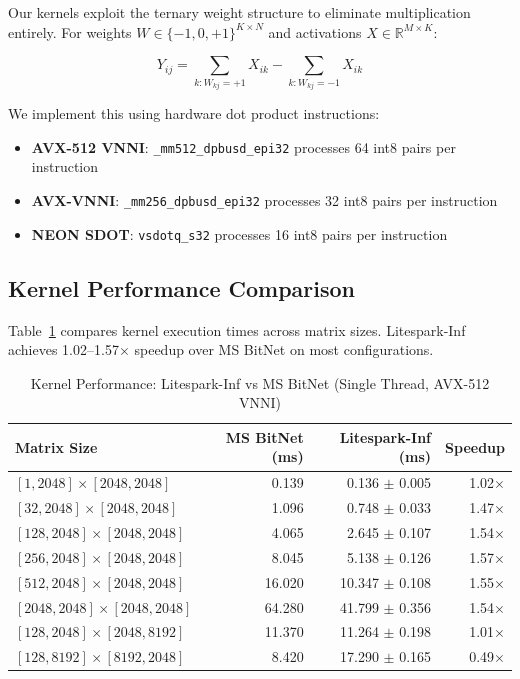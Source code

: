 \documentclass[11pt,a4paper]{article}
\begin{document}
Our kernels exploit the ternary weight structure to eliminate multiplication entirely. For weights $W \in \{-1, 0, +1\}^{K \times N}$ and activations $X \in \mathbb{R}^{M \times K}$:

\begin{equation}
Y_{ij} = \sum_{k: W_{kj}=+1} X_{ik} - \sum_{k: W_{kj}=-1} X_{ik}
\end{equation}

We implement this using hardware dot product instructions:
\begin{itemize}
    \item \textbf{AVX-512 VNNI}: \texttt{\_mm512\_dpbusd\_epi32} processes 64 int8 pairs per instruction
    \item \textbf{AVX-VNNI}: \texttt{\_mm256\_dpbusd\_epi32} processes 32 int8 pairs per instruction
    \item \textbf{NEON SDOT}: \texttt{vsdotq\_s32} processes 16 int8 pairs per instruction
\end{itemize}

\subsection{Kernel Performance Comparison}

Table~\ref{tab:kernel_perf} compares kernel execution times across matrix sizes. Litespark-Inf achieves 1.02--1.57$\times$ speedup over MS BitNet on most configurations.

\begin{table}[H]
\centering
\caption{Kernel Performance: Litespark-Inf vs MS BitNet (Single Thread, AVX-512 VNNI)}
\label{tab:kernel_perf}
\begin{tabular}{lrrr}
\toprule
\textbf{Matrix Size} & \textbf{MS BitNet (ms)} & \textbf{Litespark-Inf (ms)} & \textbf{Speedup} \\
\midrule
$[1, 2048] \times [2048, 2048]$ & 0.139 & 0.136 $\pm$ 0.005 & 1.02$\times$ \\
$[32, 2048] \times [2048, 2048]$ & 1.096 & 0.748 $\pm$ 0.033 & 1.47$\times$ \\
$[128, 2048] \times [2048, 2048]$ & 4.065 & 2.645 $\pm$ 0.107 & 1.54$\times$ \\
$[256, 2048] \times [2048, 2048]$ & 8.045 & 5.138 $\pm$ 0.126 & 1.57$\times$ \\
$[512, 2048] \times [2048, 2048]$ & 16.020 & 10.347 $\pm$ 0.108 & 1.55$\times$ \\
$[2048, 2048] \times [2048, 2048]$ & 64.280 & 41.799 $\pm$ 0.356 & 1.54$\times$ \\
$[128, 2048] \times [2048, 8192]$ & 11.370 & 11.264 $\pm$ 0.198 & 1.01$\times$ \\
$[128, 8192] \times [8192, 2048]$ & 8.420 & 17.290 $\pm$ 0.165 & 0.49$\times$ \\
\bottomrule
\end{tabular}
\end{table}
\end{document}
